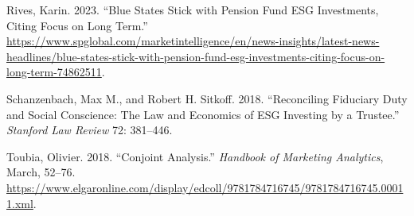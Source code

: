 \documentclass[
  12pt,
]{article}
\newlength{\cslhangindent}
\newlength{\cslentryspacingunit} %
\newenvironment{CSLReferences}[2] %
 {%
  \setlength{\parindent}{0pt}
  \ifodd #1
  \let\oldpar\par
  \def\par{\hangindent=\cslhangindent\oldpar}
  \fi
  \setlength{\parskip}{#2\cslentryspacingunit}
 }%
 {}
\begin{document}
\begin{CSLReferences}{1}{0}
\leavevmode{}%
Rives, Karin. 2023. {``Blue States Stick with Pension Fund ESG Investments, Citing Focus on Long Term.''} \url{https://www.spglobal.com/marketintelligence/en/news-insights/latest-news-headlines/blue-states-stick-with-pension-fund-esg-investments-citing-focus-on-long-term-74862511}.

\leavevmode{}%
Schanzenbach, Max M., and Robert H. Sitkoff. 2018. {``Reconciling Fiduciary Duty and Social Conscience: The Law and Economics of ESG Investing by a Trustee.''} \emph{Stanford Law Review} 72: 381--446.

\leavevmode{}%
Toubia, Olivier. 2018. {``Conjoint Analysis.''} \emph{Handbook of Marketing Analytics}, March, 52--76. \url{https://www.elgaronline.com/display/edcoll/9781784716745/9781784716745.00011.xml}.

\end{CSLReferences}
\end{document}
